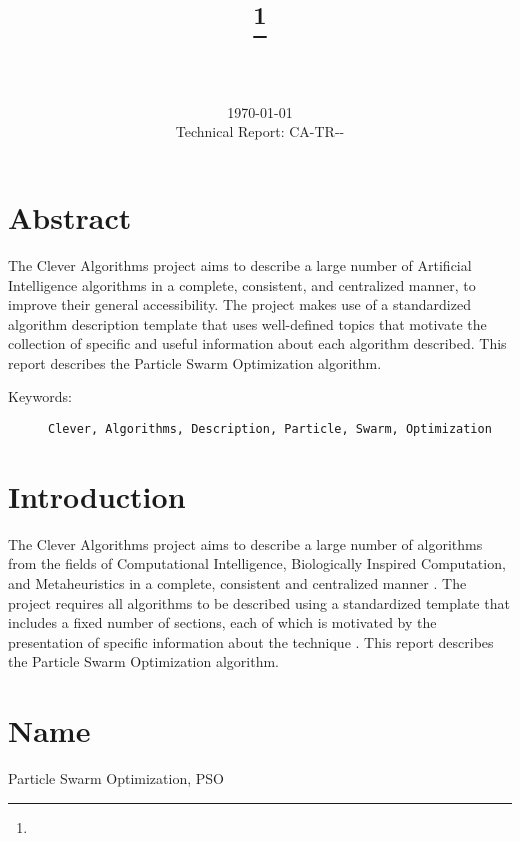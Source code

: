 \documentclass[a4paper, 11pt]{article}
\title{{\myreporttitle}\footnote{\myreportlicense}}
\author{\myreportauthor\\{\myreportemail}\\\small\myreportproject}
\date{\today\\{\small{Technical Report: CA-TR-{\myreportdate}-\myreportversion}}}
\begin{document}
\maketitle

\section*{Abstract} 
The Clever Algorithms project aims to describe a large number of Artificial Intelligence algorithms in a complete, consistent, and centralized manner, to improve their general accessibility. 
The project makes use of a standardized algorithm description template that uses well-defined topics that motivate the collection of specific and useful information about each algorithm described.
This report describes the Particle Swarm Optimization algorithm.

\begin{description}
	\item[Keywords:] {\small\texttt{Clever, Algorithms, Description, Particle, Swarm, Optimization}}
\end{description} 

\section{Introduction} 
\label{sec:intro}
The Clever Algorithms project aims to describe a large number of algorithms from the fields of Computational Intelligence, Biologically Inspired Computation, and Metaheuristics in a complete, consistent and centralized manner \cite{Brownlee2010}.
The project requires all algorithms to be described using a standardized template that includes a fixed number of sections, each of which is motivated by the presentation of specific information about the technique \cite{Brownlee2010a}.
This report describes the Particle Swarm Optimization algorithm.

\section{Name} 
\label{sec:name}
Particle Swarm Optimization, PSO
\end{document}
